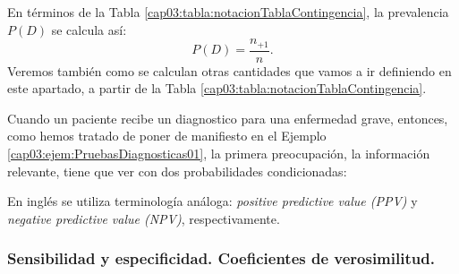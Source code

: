 En términos de la Tabla \ref{cap03:tabla:notacionTablaContingencia}, la prevalencia $P(D)$ se calcula así:
\[P(D)=\dfrac{n_{+1}}{n}.\]
Veremos también como se calculan otras cantidades que vamos a ir definiendo en este apartado, a partir de la Tabla \ref{cap03:tabla:notacionTablaContingencia}.

Cuando un paciente recibe un diagnostico para una enfermedad grave, entonces, como hemos tratado de
poner de manifiesto en el Ejemplo \ref{cap03:ejem:PruebasDiagnosticas01}, la primera preocupación,
la información relevante, tiene que ver con dos probabilidades condicionadas:
    \begin{center}
    \end{center}
En inglés se utiliza terminología análoga: {\em positive predictive value (PPV)} y {\em negative predictive value (NPV)}, respectivamente.

\subsubsection*{Sensibilidad y especificidad. Coeficientes de verosimilitud.}

